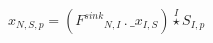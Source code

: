 \documentclass[border=2pt]{standalone}
\begin{document}
${x}{_{N, S, p}}=\left({{F^{sink}}}{_{N, I}} \, . \, {\_x}{_{I, S}}\right) \stackrel{I}{\star} {{S}}{_{I, p}}$
\end{document}
